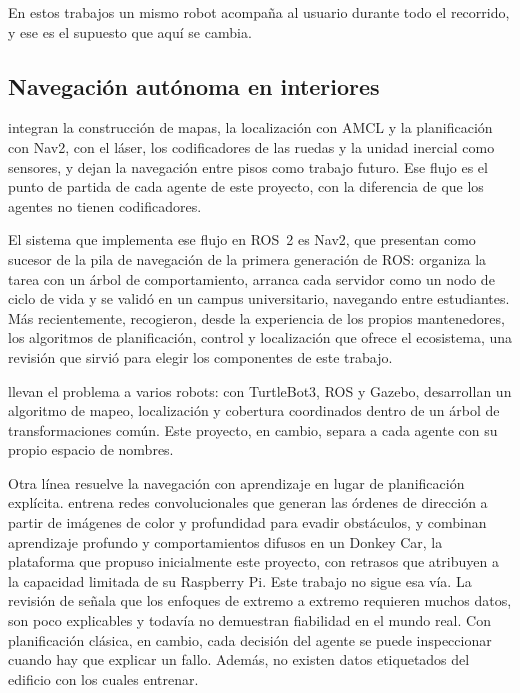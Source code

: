 En estos trabajos un mismo robot acompaña al usuario durante todo el recorrido, y ese es
el supuesto que aquí se cambia.

\subsection{Navegación autónoma en interiores}

\textcite{sojan2025autonomous} integran la construcción de mapas, la localización con
AMCL y la planificación con Nav2, con el láser, los codificadores de las ruedas y la
unidad inercial como sensores, y dejan la navegación entre pisos como trabajo futuro. Ese
flujo es el punto de partida de cada agente de este proyecto, con la diferencia de que
los agentes no tienen codificadores.

El sistema que implementa ese flujo en ROS~2 es Nav2, que \textcite{macenski2020marathon}
presentan como sucesor de la pila de navegación de la primera generación de ROS: organiza
la tarea con un árbol de comportamiento, arranca cada servidor como un nodo de ciclo de
vida y se validó en un campus universitario, navegando entre estudiantes. Más
recientemente, \textcite{macenski2023survey} recogieron, desde la experiencia de los
propios mantenedores, los algoritmos de planificación, control y localización que ofrece
el ecosistema, una revisión que sirvió para elegir los componentes de este trabajo.

\textcite{varghese2023multirobot} llevan el problema a varios robots: con TurtleBot3, ROS
y Gazebo, desarrollan un algoritmo de mapeo, localización y cobertura coordinados dentro
de un árbol de transformaciones común. Este proyecto, en cambio, separa a cada agente con
su propio espacio de nombres.

Otra línea resuelve la navegación con aprendizaje en lugar de planificación explícita.
\textcite{zain2025obstacle} entrena redes convolucionales que generan las órdenes de
dirección a partir de imágenes de color y profundidad para evadir obstáculos, y
\textcite{lopez2024enhancing} combinan aprendizaje profundo y comportamientos difusos en
un Donkey Car, la plataforma que propuso inicialmente este proyecto, con retrasos que
atribuyen a la capacidad limitada de su Raspberry Pi. Este trabajo no sigue esa vía. La
revisión de \textcite{xiao2022motion} señala que los enfoques de extremo a extremo
requieren muchos datos, son poco explicables y todavía no demuestran fiabilidad en el
mundo real. Con planificación clásica, en cambio, cada decisión del agente se puede
inspeccionar cuando hay que explicar un fallo. Además, no existen datos etiquetados del
edificio con los cuales entrenar.

